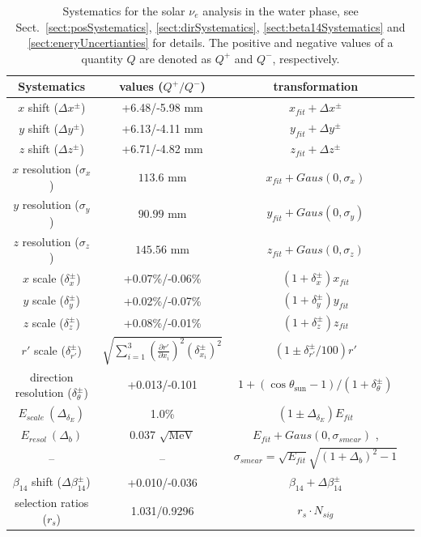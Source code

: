 \begin{table}[ht]
	\centering
\caption[Systematics for the solar $\nu_e$ analysis in the water phase.]{Systematics for the solar $\nu_e$ analysis in the water phase, see Sect.~\ref{sect:posSystematics}, \ref{sect:dirSystematics}, \ref{sect:beta14Systematics} and \ref{sect:eneryUncertianties} for details. The positive and negative values of a quantity $Q$ are denoted as $Q^+$ and $Q^-$, respectively.\label{tab:solar_uncertainties}}
	\vspace{2mm}
	\begin{tabular*}{148mm}{c@{\extracolsep{\fill}}ccc}
		\toprule
		Systematics & values ($Q^+/Q^-$) & transformation   \\
		\midrule
		$x$ shift ($\Delta x^\pm$) & +6.48/-5.98 mm  & $x_{fit}+\Delta x^\pm$ \\	
		$y$ shift ($\Delta y^\pm$)& +6.13/-4.11 mm   & $y_{fit}+\Delta y^\pm$ \\
		$z$ shift ($\Delta z^\pm$)& +6.71/-4.82 mm   & $z_{fit}+\Delta z^\pm$ \\
		$x$ resolution ($\sigma_{x}$) & $113.6$ mm& $x_{fit}+Gaus(0,\sigma_{x})$\\	
		$y$ resolution ($\sigma_{y}$) & $90.99$ mm& $y_{fit}+Gaus(0,\sigma_{y})$\\
		$z$ resolution ($\sigma_{z}$) & $145.56$ mm& $z_{fit}+Gaus(0,\sigma_{z})$\\
		$x$ scale ($\delta_x^{\pm}$)& +0.07\%/-0.06\%  & $(1+\delta_x^{\pm})x_{fit}$\\	
		$y$ scale ($\delta_y^{\pm}$)& +0.02\%/-0.07\%  & $(1+\delta_y^{\pm})y_{fit}$ \\
		$z$ scale ($\delta_z^{\pm}$)& +0.08\%/-0.01\%  & $(1+\delta_z^{\pm})z_{fit}$ \\
		$r'$ scale ($\delta_{r'}^{\pm}$)&  $\sqrt{\sum_{i=1}^3(\frac{\partial r'}{\partial x_i})^2({\delta^{\pm}_{x_i}})^2}$    & $(1\pm\delta^{\pm}_{r'}/100)r'$\\
		direction resolution ($\delta_\theta^{\pm}$)  & +0.013/-0.101 & $1+(\cos\theta_\mathrm{sun}-1)/(1+\delta_\theta^{\pm})$\\
		$E_{scale}~(\Delta_{\delta_E})$ &  1.0\%  & $(1\pm \Delta_{\delta_E})E_{fit}$\\
		$E_{resol}~(\Delta_b)$ &  0.037 $\sqrt{\mathrm{MeV}}$  & $E_{fit}+Gaus(0,\sigma_{smear})$ , \\
		-- & -- &$\sigma_{smear}=\sqrt{E_{fit}}\sqrt{(1+\Delta_b)^2-1}$\\
		$\beta_{14}$ shift ($\Delta \beta_{14}^\pm$) & +0.010/-0.036 & $\beta_{14}+\Delta \beta_{14}^\pm$\\
		selection ratios ($r_s$) & 1.031/0.9296 & $r_s\cdot N_{sig}$\\
		\bottomrule
	\end{tabular*}
\end{table}

